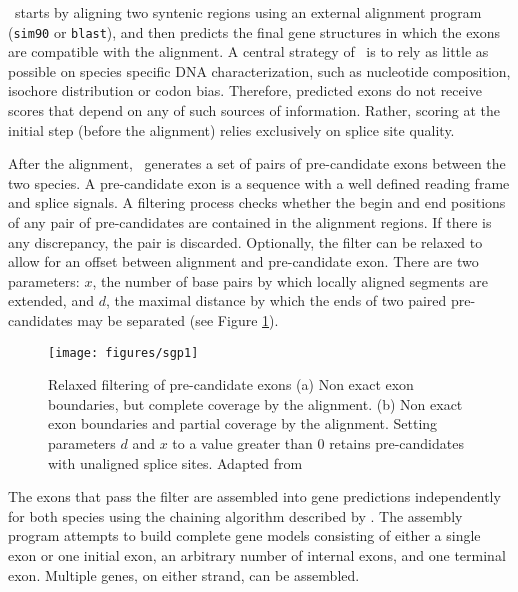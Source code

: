 \sgpo\ starts by aligning two syntenic regions using an external alignment
program (\texttt{sim90} or \texttt{blast}), and then predicts the
final gene structures in which the exons are compatible with the
alignment. A central strategy of \sgpo\ is to rely as little as
possible on species specific DNA characterization, such as nucleotide
composition, isochore distribution or codon bias. Therefore, predicted
exons do not receive scores that depend on any of such sources of
information.  Rather, scoring at the initial step (before the
alignment) relies exclusively on splice site quality.

After the alignment, \sgpo\ generates a set of pairs of pre-candidate
exons between the two species. A pre-candidate exon is a sequence with
a well defined reading frame and splice signals. A filtering process
checks whether the begin and end positions of any pair of
pre-candidates are contained in the alignment regions. If there is any
discrepancy, the pair is discarded. Optionally, the filter can be
relaxed to allow for an offset between alignment and pre-candidate
exon.  There are two parameters: $x$, the number of base pairs by
which locally aligned segments are extended, and $d$, the maximal
distance by which the ends of two paired pre-candidates may be
separated (see Figure \ref{sgp1}).


\begin{figure}[h!]
\begin{center}
\texttt{[image: figures/sgp1]}
\caption{Relaxed filtering of pre-candidate exons (a) Non exact exon
 boundaries, but complete coverage by the alignment. (b) Non exact
exon boundaries and partial coverage by the alignment. Setting
parameters $d$ and $x$ to a value greater than 0 retains pre-candidates
with unaligned splice sites. Adapted from \cite{wiehe:2001a}}
\end{center}\label{sgp1}
\end{figure}


The exons that pass the filter are assembled into gene predictions
independently for both species using the chaining algorithm described
by \cite{guigo:1998a}.  The assembly program attempts to build
complete gene models consisting of either a single exon or one initial
exon, an arbitrary number of internal exons, and one terminal
exon. Multiple genes, on either strand, can be assembled.

